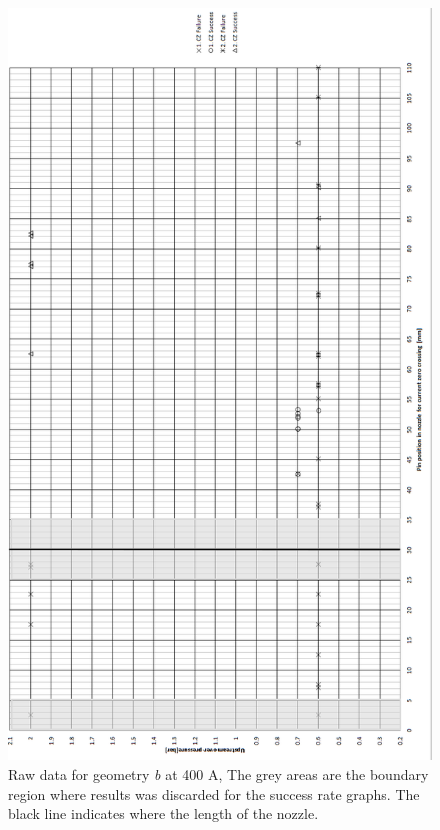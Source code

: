 \documentclass[10pt,a4paper,twoside]{article}
\begin{document}
\begin{figure}[H]
\centering
\includegraphics[scale=0.55]{Bilder/Results/rawData400AgeoB.png}
\caption{Raw data for geometry \textit{b} at 400 A, The grey areas are the boundary region where results was discarded for the success rate graphs. The black line indicates where the length of the nozzle.} \label{fig:rawData400AgeoB}
\end{figure}
\newpage
\end{document}

